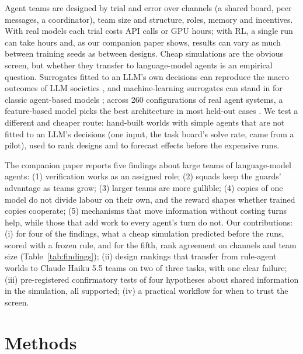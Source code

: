 \documentclass{article}
\begin{document}
Agent teams are designed by trial and error over channels (a shared board, peer messages, a coordinator), team size and structure, roles, memory and incentives. With real models each trial costs API calls or GPU hours; with RL, a single run can take hours and, as our companion paper shows, results can vary as much between training seeds as between designs. Cheap simulations are the obvious screen, but whether they transfer to language-model agents is an empirical question. Surrogates fitted to an LLM's own decisions can reproduce the macro outcomes of LLM societies \citep{itkin2026poorman}, and machine-learning surrogates can stand in for classic agent-based models \citep{angione2022surrogate}; across 260 configurations of real agent systems, a feature-based model picks the best architecture in most held-out cases \citep{kim2025scaling}. We test a different and cheaper route: hand-built worlds with simple agents that are not fitted to an LLM's decisions (one input, the task board's solve rate, came from a pilot), used to rank designs and to forecast effects before the expensive runs.

The companion paper reports five findings about large teams of language-model agents: (1) verification works as an assigned role; (2) squads keep the guards' advantage as teams grow; (3) larger teams are more gullible; (4) copies of one model do not divide labour on their own, and the reward shapes whether trained copies cooperate; (5) mechanisms that move information without costing turns help, while those that add work to every agent's turn do not. Our contributions: (i) for four of the findings, what a cheap simulation predicted before the runs, scored with a frozen rule, and for the fifth, rank agreement on channels and team size (Table~\ref{tab:findings}); (ii) design rankings that transfer from rule-agent worlds to Claude Haiku 5.5 teams on two of three tasks, with one clear failure; (iii) pre-registered confirmatory tests of four hypotheses about shared information in the simulation, all supported; (iv) a practical workflow for when to trust the screen.

\section{Methods}
\label{sec:methods}
\end{document}
